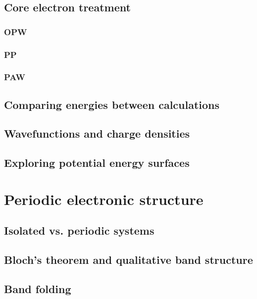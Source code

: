 \documentclass[11pt]{article}
\begin{document}
\subsection{Core electron treatment}
\label{sec:orgbf76f38}

\subsubsection{OPW}
\label{sec:org12b0942}

\subsubsection{PP}
\label{sec:org0ed047a}

\subsubsection{PAW}
\label{sec:org4b02628}

\subsection{Comparing energies between calculations}
\label{sec:orgf20e10e}

\subsection{Wavefunctions and charge densities}
\label{sec:orgf10094f}

\subsection{Exploring potential energy surfaces}
\label{sec:orgae2f6c9}
\newpage
\section{Periodic electronic structure}
\label{sec:orgba6f024}
\subsection{Isolated vs. periodic systems}
\label{sec:orgc0039a7}
\subsection{Bloch's theorem and qualitative band structure}
\label{sec:org5d6982e}
\subsection{Band folding}
\label{sec:org8d668bf}
\end{document}
